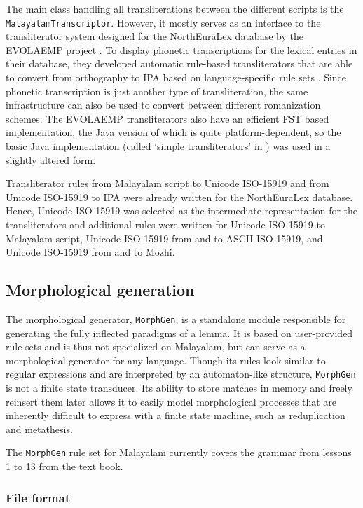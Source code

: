 \documentclass[a4paper]{article}
\newcommand{\typ}[1]{\texttt{#1}}
\begin{document}
The main class handling all transliterations between the different scripts is the \typ{MalayalamTranscriptor}. However, it mostly serves as an interface to the transliterator system designed for the NorthEuraLex database by the EVOLAEMP project \parencite{northeuralex}. To display phonetic transcriptions for the lexical entries in their database, they developed automatic rule-based transliterators that are able to convert from orthography to IPA based on language-specific rule sets \parencite{daneyko2016translit}. Since phonetic transcription is just another type of transliteration, the same infrastructure can also be used to convert between different romanization schemes. The EVOLAEMP transliterators also have an efficient FST based implementation, the Java version of which is quite platform-dependent, so the basic Java implementation (called `simple transliterators' in \textcite{daneyko2016translit}) was used in a slightly altered form.

Transliterator rules from Malayalam script to Unicode ISO-15919 and from Unicode ISO-15919 to IPA were already written for the NorthEuraLex database. Hence, Unicode ISO-15919 was selected as the intermediate representation for the transliterators and additional rules were written for Unicode ISO-15919 to Malayalam script, Unicode ISO-15919 from and to ASCII ISO-15919, and Unicode ISO-15919 from and to Mozhi.


\subsection{Morphological generation}

The morphological generator, \typ{MorphGen}, is a standalone module responsible for generating the fully inflected paradigms of a lemma. It is based on user-provided rule sets and is thus not specialized on Malayalam, but can serve as a morphological generator for any language. Though its rules look similar to regular expressions and are interpreted by an automaton-like structure, \typ{MorphGen} is not a finite state transducer. Its ability to store matches in memory and freely reinsert them later allows it to easily model morphological processes that are inherently difficult to express with a finite state machine, such as reduplication and metathesis.

The \typ{MorphGen} rule set for Malayalam currently covers the grammar from lessons 1 to 13 from the \textcite{moag} text book.

\subsubsection{File format}
\end{document}
